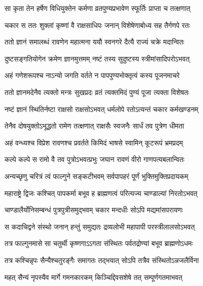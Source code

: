 \twolineshloka
{सा कृता तेन हर्षेण विधियुक्तेन कर्मणा}
{व्रतपुण्यप्रभावेण स्फूर्तिः प्राप्ता च तत्क्षणात्} %

\twolineshloka
{चकार स ततः शुक्लां कृष्णां वै राक्षसाधिपः}
{जनान् विशेषेणाबोध्य सह तैर्गणपे रतः} %

\twolineshloka
{ततो ज्ञानं समालब्धं रावणेन महात्मना}
{ययौ स्वनगरे दैत्यै राज्यं चक्रे मदान्वितः} %

\twolineshloka
{दुष्टसङ्गतियोगेन क्रमेण ज्ञानमुत्तमम्}
{नष्टं तस्य सुदुष्टस्य स्त्रीमांसादिपरोऽभवत्} %

\twolineshloka
{अहं गणेशरूपश्च नाऽन्यो जगति वर्तते}
{न पापपुण्यभोक्तृत्वं कस्य पूजनमाचरे} %

\twolineshloka
{ततो ज्ञानमदेनैव त्यक्तो मन्त्रः सुखप्रदः}
{व्रतं त्यक्तमिदं पुण्यं पूजा त्यक्ता विशेषतः} %

\twolineshloka
{नष्टं ज्ञानं स्थितिर्नष्टा राक्षसो राक्षसोऽभवत्}
{धर्मलोपे रतोऽत्यन्तं चकार कर्मखण्डनम्} %

\twolineshloka
{तेनैव दोषयुक्तोऽभूद्धतो रामेण तत्क्षणात्}
{राक्षसैः स्वजनैः सार्धं तव पुत्रेण धीमता} %


\twolineshloka
{अहं वन्ध्यश्च विप्रेश रावणश्च प्रवर्तते}
{किमिदं भाषसे स्वामिन् कूटरूपं भ्रमप्रदम्} %


\twolineshloka
{कल्पे कल्पे स रामो वै तव पुत्रोऽभवत्प्रभुः}
{जघान रावणं वीरो गाणपत्यबलान्वितः} %

\twolineshloka
{अन्यच्छृणु चरित्रं त्वं फाल्गुने सङ्कटीभवम्}
{सर्वपापहरं पूर्णं भुक्तिमुक्तिप्रदायकम्} %

\twolineshloka
{महाराष्ट्रे द्विजः कश्चित् पापकर्मा बभूव ह}
{ब्राह्मणत्वं परित्यज्य चाण्डाल्यां निरतोऽभवत्} %

\twolineshloka
{चाण्डालैर्योनिसम्बन्धं पुत्रपुत्रीसमुद्भवम्}
{चकार मन्दधीः सोऽपि मद्यमांसपरायणः} %

\twolineshloka
{स कदाचिद्वने संस्थो जनान् हन्तुं समुद्यतः}
{द्रव्यलोभी महापापी परस्त्रीलालसोऽभवत्} %

\twolineshloka
{तत्र फाल्गुनमासे सा चतुर्थी कृष्णगाऽऽगता}
{संस्थितः पर्वतद्रोण्यां बभूव ब्राह्मणोऽधमः} %

\twolineshloka
{तत्र कश्चिन्नृपः सैन्यैश्चतुरङ्गैः समागतः}
{तद्भयात् सोऽपि तत्रैव संस्थितोऽन्नजलैर्विना} %

\twolineshloka
{महत् सैन्यं नृपस्यैव मार्गे गमनकारकम्}
{किञ्चिद्दिवसशेषे तत् सम्पूर्णगतमाभवत्} %

